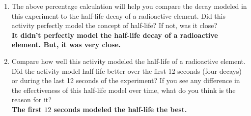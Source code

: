 \begin{enumerate}
  \item The above percentage calculation will help you compare the decay modeled
    in this experiment to the half-life decay of a radioactive element. Did this
    activity perfectly model the concept of half-life? If not, was it close? \\
    \bf{It didn't perfectly model the half-life decay of a radioactive element.
    But, it was very close.}

  \item Compare how well this activity modeled the half-life of a radioactive
    element. Did the activity model half-life better over the first 12 seconds
    (four decays) or during the last 12 seconds of the experiment? If you see
    any difference in the effectiveness of this half-life model over time, what
    do you think is the reason for it? \\
    \bf{The first $12$ seconds modeled the half-life the best.}
\end{enumerate}
